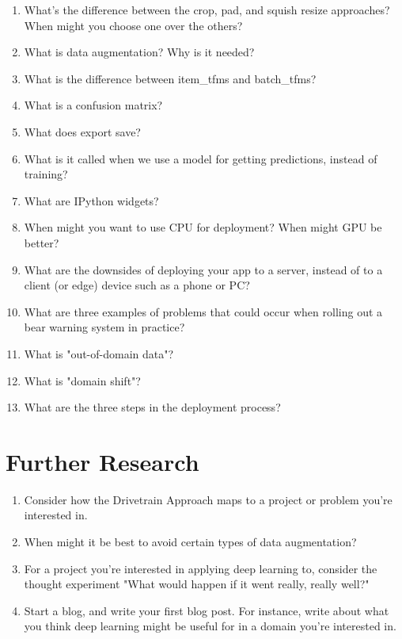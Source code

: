 \documentclass[12pt,a4paper]{article}
\begin{document}
\begin{enumerate}
\item What's the difference between the crop, pad, and squish resize approaches? When might you choose one over the others? \\
\item What is data augmentation? Why is it needed? \\
\item What is the difference between item\_tfms and batch\_tfms? \\
\item What is a confusion matrix? \\
\item What does export save? \\
\item What is it called when we use a model for getting predictions, instead of training? \\
\item What are IPython widgets? \\
\item When might you want to use CPU for deployment? When might GPU be better? \\
\item What are the downsides of deploying your app to a server, instead of to a client (or edge) device such as a phone or PC? \\
\item What are three examples of problems that could occur when rolling out a bear warning system in practice? \\
\item What is "out-of-domain data"? \\
\item What is "domain shift"? \\
\item What are the three steps in the deployment process? \\
\end{enumerate}

\section*{Further Research}

\begin{enumerate}
\item Consider how the Drivetrain Approach maps to a project or problem you're interested in. \\
\item When might it be best to avoid certain types of data augmentation? \\
\item For a project you're interested in applying deep learning to, consider the thought experiment "What would happen if it went really, really well?" \\
\item Start a blog, and write your first blog post. For instance, write about what you think deep learning might be useful for in a domain you're interested in. \\
\end{enumerate}
\end{document}
